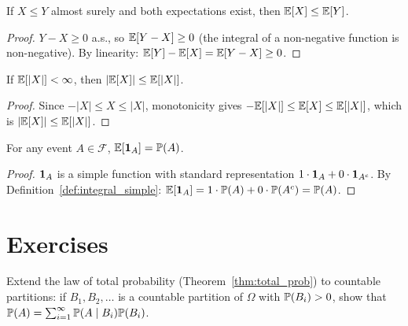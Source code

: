 \documentclass[11pt,a4paper]{article}
\begin{document}
\begin{proposition}
\label{prop:monotonicity}
If $X \leq Y$ almost surely and both expectations exist, then
$\mathbb{E}[X] \leq \mathbb{E}[Y]$.
\end{proposition}

\begin{proof}
$Y - X \geq 0$ a.s., so $\mathbb{E}[Y - X] \geq 0$ (the integral of a
non-negative function is non-negative). By linearity:
$\mathbb{E}[Y] - \mathbb{E}[X] = \mathbb{E}[Y - X] \geq 0$.
\end{proof}

\begin{proposition}
\label{prop:triangle}
If $\mathbb{E}[|X|] < \infty$, then $|\mathbb{E}[X]| \leq \mathbb{E}[|X|]$.
\end{proposition}

\begin{proof}
Since $-|X| \leq X \leq |X|$, monotonicity gives
$-\mathbb{E}[|X|] \leq \mathbb{E}[X] \leq \mathbb{E}[|X|]$, which is $|\mathbb{E}[X]| \leq \mathbb{E}[|X|]$.
\end{proof}

\begin{proposition}
\label{prop:expect_indicator}
For any event $A \in \mathcal{F}$, $\mathbb{E}[\mathbf{1}_A] = \mathbb{P}(A)$.
\end{proposition}

\begin{proof}
$\mathbf{1}_A$ is a simple function with standard representation
$1 \cdot \mathbf{1}_A + 0 \cdot \mathbf{1}_{A^c}$. By
Definition~\ref{def:integral_simple}:
$\mathbb{E}[\mathbf{1}_A] = 1 \cdot \mathbb{P}(A) + 0 \cdot \mathbb{P}(A^c) = \mathbb{P}(A)$.
\end{proof}


\section{Exercises}
\label{sec:exercises}

\begin{exercise}
\label{ex:total_prob_countable}
Extend the law of total probability
(Theorem~\ref{thm:total_prob}) to countable partitions: if
$B_1, B_2, \ldots$ is a countable partition of $\Omega$ with
$\mathbb{P}(B_i) > 0$, show that $\mathbb{P}(A) = \sum_{i=1}^\infty
\mathbb{P}(A \mid B_i) \mathbb{P}(B_i)$.
\end{exercise}
\end{document}

